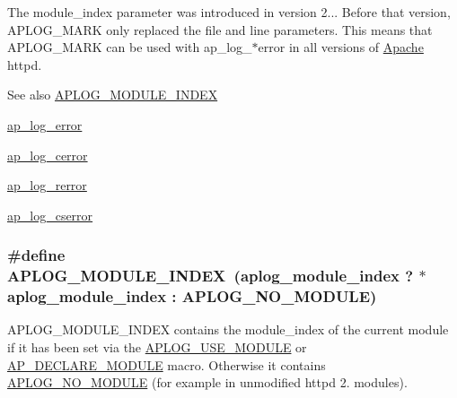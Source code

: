 The module\+\_\+index parameter was introduced in version 2... Before that version, A\+P\+L\+O\+G\+\_\+\+M\+A\+RK only replaced the file and line parameters. This means that A\+P\+L\+O\+G\+\_\+\+M\+A\+RK can be used with ap\+\_\+log\+\_\+$\ast$error in all versions of \hyperlink{namespaceApache}{Apache} httpd.

\begin{DoxySeeAlso}{See also}
\hyperlink{group__APACHE__CORE__LOG_gae75325996d1b2cf6120dded4cb153a22}{A\+P\+L\+O\+G\+\_\+\+M\+O\+D\+U\+L\+E\+\_\+\+I\+N\+D\+EX} 

\hyperlink{group__APACHE__CORE__LOG_ga5e6676c87418af7a1d323a116c78ecb4}{ap\+\_\+log\+\_\+error} 

\hyperlink{group__APACHE__CORE__LOG_ga60ef6919b8e1b691b0c1ac4d67c9449f}{ap\+\_\+log\+\_\+cerror} 

\hyperlink{group__APACHE__CORE__LOG_ga4c112558ccffd6b363da102b2052d2a6}{ap\+\_\+log\+\_\+rerror} 

\hyperlink{group__APACHE__CORE__LOG_gad5cf626e04304c783570bab02a7bd291}{ap\+\_\+log\+\_\+cserror} 
\end{DoxySeeAlso}
\subsubsection[{\texorpdfstring{A\+P\+L\+O\+G\+\_\+\+M\+O\+D\+U\+L\+E\+\_\+\+I\+N\+D\+EX}{APLOG_MODULE_INDEX}}]{\setlength{\rightskip}{0pt plus 5cm}\#define A\+P\+L\+O\+G\+\_\+\+M\+O\+D\+U\+L\+E\+\_\+\+I\+N\+D\+EX~(aplog\+\_\+module\+\_\+index ? $\ast$aplog\+\_\+module\+\_\+index \+: {\bf A\+P\+L\+O\+G\+\_\+\+N\+O\+\_\+\+M\+O\+D\+U\+LE})}\hypertarget{group__APACHE__CORE__LOG_gae75325996d1b2cf6120dded4cb153a22}{}\label{group__APACHE__CORE__LOG_gae75325996d1b2cf6120dded4cb153a22}
A\+P\+L\+O\+G\+\_\+\+M\+O\+D\+U\+L\+E\+\_\+\+I\+N\+D\+EX contains the module\+\_\+index of the current module if it has been set via the \hyperlink{service_8c_a42f31034ed64c8c05beca3967f16efa9}{A\+P\+L\+O\+G\+\_\+\+U\+S\+E\+\_\+\+M\+O\+D\+U\+LE} or \hyperlink{worker_8c_af11c7f9217ea17cef445194c711fe145}{A\+P\+\_\+\+D\+E\+C\+L\+A\+R\+E\+\_\+\+M\+O\+D\+U\+LE} macro. Otherwise it contains \hyperlink{group__APACHE__CORE__LOG_gad04ae11f8e466af433e82e961d12a6bf}{A\+P\+L\+O\+G\+\_\+\+N\+O\+\_\+\+M\+O\+D\+U\+LE} (for example in unmodified httpd 2. modules).

